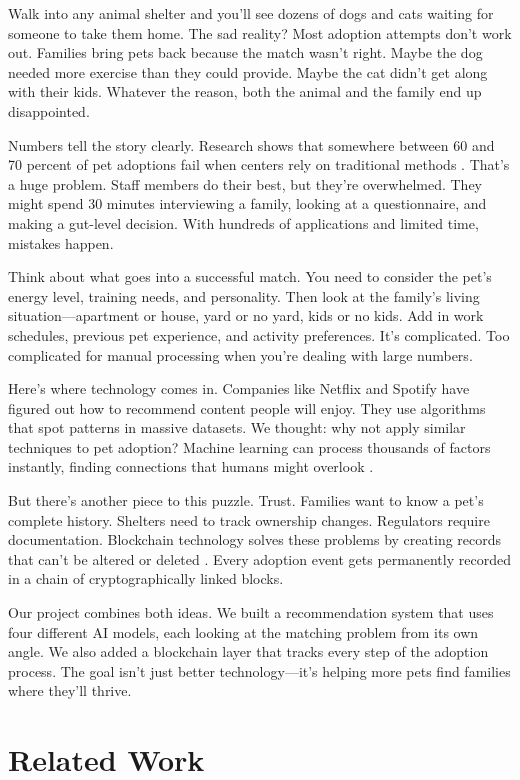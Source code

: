 \documentclass[conference]{IEEEtran}
\begin{document}
Walk into any animal shelter and you'll see dozens of dogs and cats waiting for someone to take them home. The sad reality? Most adoption attempts don't work out. Families bring pets back because the match wasn't right. Maybe the dog needed more exercise than they could provide. Maybe the cat didn't get along with their kids. Whatever the reason, both the animal and the family end up disappointed.

Numbers tell the story clearly. Research shows that somewhere between 60 and 70 percent of pet adoptions fail when centers rely on traditional methods \cite{petadoption2023}. That's a huge problem. Staff members do their best, but they're overwhelmed. They might spend 30 minutes interviewing a family, looking at a questionnaire, and making a gut-level decision. With hundreds of applications and limited time, mistakes happen.

Think about what goes into a successful match. You need to consider the pet's energy level, training needs, and personality. Then look at the family's living situation—apartment or house, yard or no yard, kids or no kids. Add in work schedules, previous pet experience, and activity preferences. It's complicated. Too complicated for manual processing when you're dealing with large numbers.

Here's where technology comes in. Companies like Netflix and Spotify have figured out how to recommend content people will enjoy. They use algorithms that spot patterns in massive datasets. We thought: why not apply similar techniques to pet adoption? Machine learning can process thousands of factors instantly, finding connections that humans might overlook \cite{aiapplications2024}.

But there's another piece to this puzzle. Trust. Families want to know a pet's complete history. Shelters need to track ownership changes. Regulators require documentation. Blockchain technology solves these problems by creating records that can't be altered or deleted \cite{blockchain2023}. Every adoption event gets permanently recorded in a chain of cryptographically linked blocks.

Our project combines both ideas. We built a recommendation system that uses four different AI models, each looking at the matching problem from its own angle. We also added a blockchain layer that tracks every step of the adoption process. The goal isn't just better technology—it's helping more pets find families where they'll thrive.

\section{Related Work}
\end{document}
